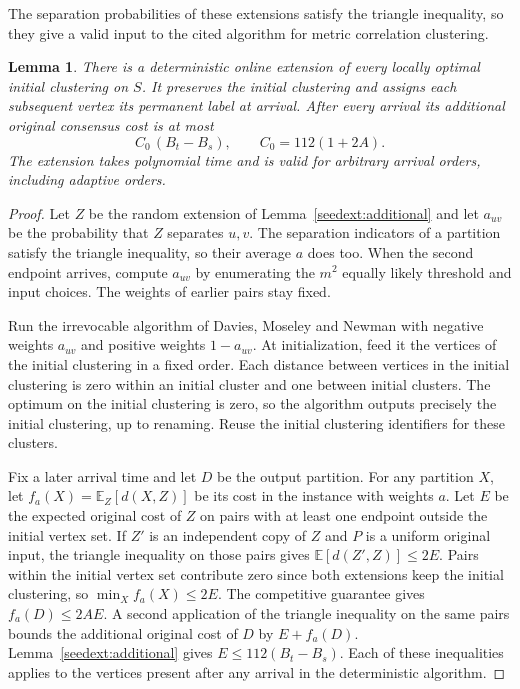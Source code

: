 \documentclass[11pt]{article}
\newtheorem{lemma}[theorem]{Lemma}
\begin{document}
The separation probabilities of these extensions satisfy the triangle
inequality, so they give a valid input to the cited algorithm for
metric correlation clustering.

\begin{lemma}
\label{virt:lemma}
There is a deterministic online extension of every locally optimal initial clustering
on $S$. It preserves the initial clustering and assigns each subsequent
vertex its permanent label at arrival. After every arrival its additional
original consensus cost is at most
\[
 C_0\,(B_t-B_s),\qquad C_0=112(1+2A).
\]
The extension takes polynomial time and is valid for arbitrary arrival
orders, including adaptive orders.
\end{lemma}
\begin{proof}
Let $Z$ be the random extension of Lemma~\ref{seedext:additional}
and let $a_{uv}$ be the probability that $Z$ separates $u,v$.
The separation indicators of a partition satisfy the triangle
inequality, so their average $a$ does too. When the second endpoint
arrives, compute $a_{uv}$ by enumerating the $m^2$ equally likely
threshold and input choices. The weights of earlier pairs stay fixed.

Run the irrevocable algorithm of Davies, Moseley and Newman with negative
weights $a_{uv}$ and positive weights $1-a_{uv}$. At initialization,
feed it the vertices of the initial clustering in a fixed order. Each distance between
vertices in the initial clustering is zero
within an initial cluster and one between initial clusters. The optimum on the
initial clustering is zero, so the algorithm outputs precisely the initial clustering,
up to renaming. Reuse the initial clustering identifiers for these clusters.

Fix a later arrival time and let $D$ be the output partition. For any
partition $X$, let $f_a(X)=\mathbb E_Z[d(X,Z)]$ be its cost in the
instance with weights $a$. Let $E$ be the expected original cost
of $Z$ on pairs with at least one endpoint outside the initial vertex set. If
$Z'$ is an independent copy of $Z$ and $P$ is a uniform original
input, the triangle inequality on those pairs gives
$\mathbb E[d(Z',Z)]\le2E$. Pairs within the initial vertex set contribute zero since
both extensions keep the initial clustering, so $\min_X f_a(X)\le2E$.
The competitive guarantee gives $f_a(D)\le2AE$. A second
application of the triangle inequality on the same pairs bounds
the additional original cost of $D$ by $E+f_a(D)$.
Lemma~\ref{seedext:additional} gives $E\le112(B_t-B_s)$.
Each of these inequalities applies to the vertices present after any arrival in the
deterministic algorithm.
\end{proof}
\end{document}
